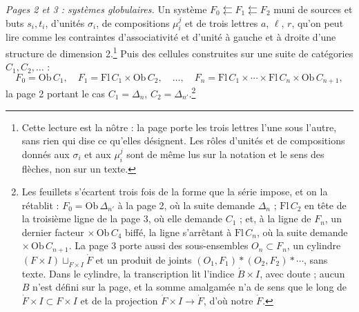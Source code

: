 \documentclass[11pt,a4paper]{article}
\begin{document}
\emph{Pages 2 et 3 : systèmes globulaires.} Un système
$F_{0} \leftleftarrows F_{1} \leftleftarrows F_{2}$ muni de sources et buts
$s_{i}, t_{i}$, d'unités $\sigma_{i}$, de compositions $\mu_{i}^{j}$ et de trois
lettres $a$, $\ell$, $r$, qu'on peut lire comme les contraintes d'associativité
et d'unité à gauche et à droite d'une structure de dimension
2.\footnote{Cette lecture est la nôtre : la page porte les trois lettres l'une
sous l'autre, sans rien qui dise ce qu'elles désignent. Les rôles d'unités et
de compositions donnés aux $\sigma_{i}$ et aux $\mu_{i}^{j}$ sont de même
lus sur la notation et le sens des flèches, non sur un texte.} Puis des cellules
construites sur une suite de catégories $C_{1}, C_{2}, \ldots$ :
\[
F_{0} = \mathrm{Ob}\, C_{1}, \quad
F_{1} = \mathrm{Fl}\, C_{1} \times \mathrm{Ob}\, C_{2}, \quad
\ldots, \quad
F_{n} = \mathrm{Fl}\, C_{1} \times \cdots \times \mathrm{Fl}\, C_{n}
\times \mathrm{Ob}\, C_{n+1},
\]
la page 2 portant le cas $C_{1} = \Delta_{n}$, $C_{2} = \Delta_{n'}$.\footnote{Les
feuillets s'écartent trois fois de la forme que la série impose, et on la
rétablit : $F_{0} = \mathrm{Ob}\,\Delta_{n'}$ à la page 2, où la suite
demande $\Delta_{n}$ ; $\mathrm{Fl}\, C_{2}$ en tête de la troisième ligne
de la page 3, où elle demande $C_{1}$ ; et, à la ligne de $F_{n}$, un dernier
facteur $\times\, \mathrm{Ob}\, C_{4}$ biffé, la ligne s'arrêtant à
$\mathrm{Fl}\, C_{n}$, où la suite demande $\times\, \mathrm{Ob}\,
C_{n+1}$. La page 3 porte aussi des sous-ensembles $O_{n} \subset F_{n}$, un
cylindre $(F \times I) \sqcup_{\dot{F} \times I} \dot{F}$ et un produit de
joints $(O_{1}, F_{1}) * (O_{2}, F_{2}) * \cdots$, sans texte. Dans le
cylindre, la transcription lit l'indice $\dot{B} \times I$, avec doute ; aucun
$B$ n'est défini sur la page, et la somme amalgamée n'a de sens que le long de
$\dot{F} \times I \subset F \times I$ et de la projection $\dot{F} \times I
\to \dot{F}$, d'où notre $\dot{F}$.}
\end{document}
